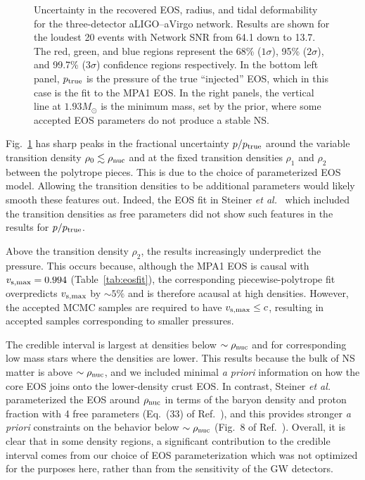 \documentclass[twocolumn,prd,amssymb,aps,nofootinbib,showpacs,epsf]{revtex4}
\begin{document}
\begin{figure}[!htb]
\begin{center}
\caption{Uncertainty in the recovered EOS, radius, and tidal deformability for the three-detector aLIGO--aVirgo network. Results are shown for the loudest 20 events with Network SNR from 64.1 down to 13.7. The red, green, and blue regions represent the 68\% ($1\sigma$), 95\% ($2\sigma$), and 99.7\% ($3\sigma$) confidence regions respectively. In the bottom left panel, $p_{\rm true}$ is the pressure of the true ``injected'' EOS, which in this case is the fit to the MPA1 EOS. In the right panels, the vertical line at $1.93M_\odot$ is the minimum mass, set by the prior, where some accepted EOS parameters do not produce a stable NS.}
\label{fig:mpa1fit}
\end{center}
\end{figure}

Fig.~\ref{fig:mpa1fit} has sharp peaks in the fractional uncertainty $p/p_{\rm true}$ around the variable transition density $\rho_0 \lesssim \rho_{\rm nuc}$ and at the fixed transition densities $\rho_1$ and $\rho_2$ between the polytrope pieces. This is due to the choice of parameterized EOS model. Allowing the transition densities to be additional parameters would likely smooth these features out. Indeed, the EOS fit in Steiner {\it et al.}~\cite{SteinerLattimerBrown2010} which included the transition densities as free parameters did not show such features in the results for $p/p_{\rm true}$. 

Above the transition density $\rho_2$, the results increasingly underpredict the pressure. This occurs because, although the MPA1 EOS is causal with $v_{\rm s,max}=0.994$ (Table~\ref{tab:eosfit}), the corresponding piecewise-polytrope fit overpredicts $v_{\rm s,max}$ by $\sim 5\%$ and is therefore acausal at high densities. However, the accepted MCMC samples are required to have $v_{\rm s,max} \leq c$, resulting in accepted samples corresponding to smaller pressures. 

The credible interval is largest at densities below $\sim \rho_{\rm nuc}$ and for corresponding low mass stars where the densities are lower. This results because the bulk of NS matter is above $\sim \rho_{\rm nuc}$, and we included minimal {\it a priori} information on how the core EOS joins onto the lower-density crust EOS. In contrast, Steiner {\it et al.}~\cite{SteinerLattimerBrown2010} parameterized the EOS around $\rho_{\rm nuc}$ in terms of the baryon density and proton fraction with 4 free parameters (Eq.~(33) of Ref.~\cite{SteinerLattimerBrown2010}), and this provides stronger {\it a priori} constraints on the behavior below $\sim \rho_{\rm nuc}$ (Fig.~8 of Ref.~\cite{SteinerLattimerBrown2010}). Overall, it is clear that in some density regions, a significant contribution to the credible interval comes from our choice of EOS parameterization which was not optimized for the purposes here, rather than from the sensitivity of the GW detectors. 
\end{document}
